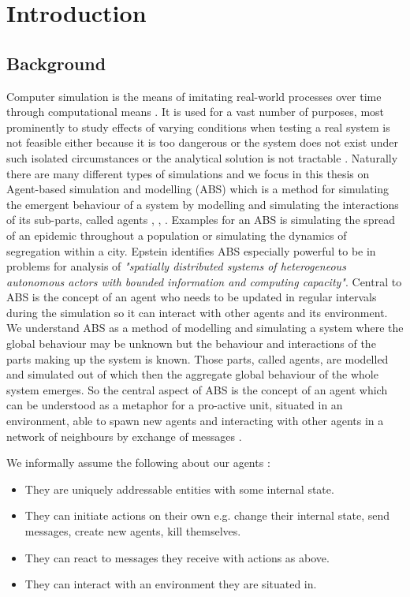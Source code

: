 \chapter{Introduction}
\label{chap:intro}

\section{Background}
Computer simulation is the means of imitating real-world processes over time through computational means \cite{banks_discrete-event_2013}. It is used for a vast number of purposes, most prominently to study effects of varying conditions when testing a real system is not feasible either because it is too dangerous or the system does not exist under such isolated circumstances or the analytical solution is not tractable \cite{sokolowski_principles_2009}. Naturally there are many different types of simulations and we focus in this thesis on Agent-based simulation and modelling (ABS) which is a method for simulating the emergent behaviour of a system by modelling and simulating the interactions of its sub-parts, called agents \cite{siebers_introduction_2008}, \cite{axelrod_guide_2006}, \cite{wilensky_introduction_2015}. Examples for an ABS is simulating the spread of an epidemic throughout a population or simulating the dynamics of segregation within a city. Epstein \cite{epstein_generative_2012} identifies ABS especially powerful to be in problems for analysis of \textit{"spatially distributed systems of heterogeneous autonomous actors with bounded information and computing capacity"}. Central to ABS is the concept of an agent who needs to be updated in regular intervals during the simulation so it can interact with other agents and its environment.
We understand ABS as a method of modelling and simulating a system where the global behaviour may be unknown but the behaviour and interactions of the parts making up the system is known. Those parts, called agents, are modelled and simulated out of which then the aggregate global behaviour of the whole system emerges. So the central aspect of ABS is the concept of an agent which can be understood as a metaphor for a pro-active unit, situated in an environment, able to spawn new agents and interacting with other agents in a network of neighbours by exchange of messages \cite{wooldridge_introduction_2009}.

We informally assume the following about our agents \cite{wooldridge_intelligent_1995}:

\begin{itemize}
	\item They are uniquely addressable entities with some internal state.
	\item They can initiate actions on their own e.g. change their internal state, send messages, create new agents, kill themselves.
	\item They can react to messages they receive with actions as above.
	\item They can interact with an environment they are situated in.
\end{itemize} 

